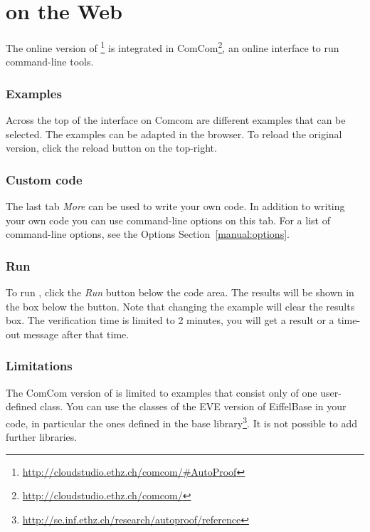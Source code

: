 \section{\AutoProof on the Web}

    The online version of \AutoProof\footnote{\url{http://cloudstudio.ethz.ch/comcom/\#AutoProof}} is integrated in ComCom\footnote{\url{http://cloudstudio.ethz.ch/comcom/}}, an online interface to run command-line tools.

\subsubsection{Examples}

    Across the top of the \AutoProof interface on Comcom are different examples that can be selected. The examples can be adapted in the browser. To reload the original version, click the reload button on the top-right.

\subsubsection{Custom code}

    The last tab \emph{More \AutoProof} can be used to write your own code. In addition to writing your own code you can use command-line options on this tab. For a list of command-line options, see the \AutoProof Options Section~\ref{manual:options}.

\subsubsection{Run \AutoProof}

    To run \AutoProof, click the \emph{Run} button below the code area. The results will be shown in the box below the button. Note that changing the example will clear the results box. The verification time is limited to 2 minutes, you will get a result or a time-out message after that time.

\subsubsection{Limitations}

    The ComCom version of \AutoProof is limited to examples that consist only of one user-defined class. You can use the classes of the EVE version of EiffelBase in your code, in particular the ones defined in the \AutoProof base library\footnote{\url{http://se.inf.ethz.ch/research/autoproof/reference}}. It is not possible to add further libraries.


